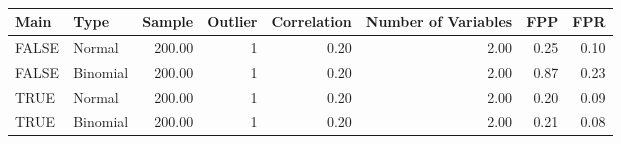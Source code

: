 \begin{longtable}{llrrrrrr}
\caption{} \\ 
  \hline
Main & Type & Sample & Outlier & Correlation & Number of Variables & FPP & FPR \\ 
  \hline
FALSE & Normal & 200.00 &   1 & 0.20 & 2.00 & 0.25 & 0.10 \\ 
  FALSE & Binomial & 200.00 &   1 & 0.20 & 2.00 & 0.87 & 0.23 \\ 
  TRUE & Normal & 200.00 &   1 & 0.20 & 2.00 & 0.20 & 0.09 \\ 
  TRUE & Binomial & 200.00 &   1 & 0.20 & 2.00 & 0.21 & 0.08 \\ 
   \hline
\hline
\end{longtable}
